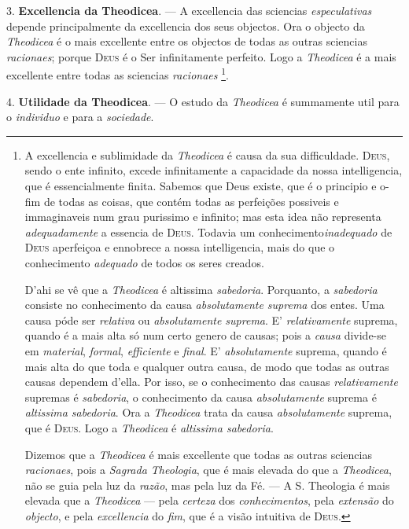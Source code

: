 3. \textbf{Excellencia da Theodicea}. --- A excellencia das sciencias \emph{especulativas} depende principalmente da excellencia dos seus objectos. Ora o objecto da \emph{Theodicea} é o mais excellente entre os objectos de todas as outras sciencias \emph{racionaes}; porque \textsc{Deus} é o Ser infinitamente perfeito. Logo a \emph{Theodicea} é a mais excellente entre todas as sciencias \emph{racionaes} \footnote{A excellencia e sublimidade da \emph{Theodicea} é causa da sua difficuldade. \textsc{Deus}, sendo o ente infinito, excede infinitamente a capacidade da nossa intelligencia, que é essencialmente finita. Sabemos que Deus existe, que é o principio e o-fim de todas as coisas, que contém todas as perfeições possiveis e immaginaveis num grau purissimo e infinito; mas esta idea não representa \emph{adequadamente} a essencia de \textsc{Deus}. Todavia um conhecimento\emph{inadequado} de \textsc{Deus} aperfeiçoa e ennobrece a nossa intelligencia, mais do que o conhecimento \emph{adequado} de todos os seres creados.\par D'ahi se vê que a \emph{Theodicea} é altissima \emph{sabedoria}. Porquanto, a \emph{sabedoria} consiste no conhecimento da causa \emph{absolutamente suprema} dos entes. Uma causa póde ser \emph{relativa} ou \emph{absolutamente suprema}. E' \emph{relativamente} suprema, quando é a mais alta só num certo genero de causas; pois a \emph{causa} divide-se em \emph{material}, \emph{formal}, \emph{efficiente} e \emph{final}. E' \emph{absolutamente} suprema, quando é mais alta do que toda e qualquer outra causa, de modo que todas as outras causas dependem d'ella. Por isso, se o conhecimento das causas \emph{relativamente} supremas é \emph{sabedoria}, o conhecimento da causa \emph{absolutamente} suprema é \emph{altissima sabedoria}. Ora a \emph{Theodicea} trata da causa \emph{absolutamente} suprema, que é \textsc{Deus}. Logo a \emph{Theodicea} é \emph{altissima sabedoria}.\par Dizemos que a \emph{Theodicea} é mais excellente que todas as outras sciencias \emph{racionaes}, pois a \emph{Sagrada Theologia}, que é mais elevada do que a \emph{Theodicea}, não se guia pela luz da \emph{razão}, mas pela luz da Fé. --- A S. Theologia é mais elevada que a \emph{Theodicea} --- pela \emph{certeza} dos \emph{conhecimentos}, pela \emph{extensão} do \emph{objecto}, e pela \emph{excellencia} do \emph{fim}, que é a visão intuitiva de \textsc{Deus}.}.

 4. \textbf{Utilidade da Theodicea}. --- O estudo da \emph{Theodicea} é summamente util para o \emph{individuo} e para a \emph{sociedade}.

